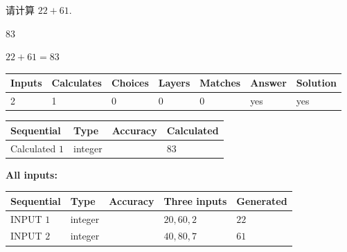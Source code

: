 \documentclass{ctexart}
\begin{document}
  
 
请计算 $ %
22 +  %
61 $.
 
 
 
\noindent{}
 
 

83
 
 
\noindent{}
 
 

 
 
 
\noindent{}
 
 

$ %
22 +  %
61=   %
83$
 
 
\noindent{}
 
 

 
   
   
   
   
\noindent\begin{tabular}{|l|l|l|l|l|l|l|}
 \hline
Inputs & Calculates & Choices & Layers & Matches & Answer & Solution \\ \hline
 2  & 
 1  & 
 0
  & 
 0  & 
 0  & 
  yes & 
  yes 
  \\ \hline
 \end{tabular}
   
   
   
   
\noindent{}
   
   
  
  
\noindent\begin{tabular}{|l|l|l|l|}
\hline
 Sequential & Type & Accuracy & Calculated \\ 
\hline
 
 
  Calculated $  1 $ & integer &  & 
  $ 83 $ 
 \\  \hline  
 \end{tabular}
   
   
   
   
\noindent\vspace{0.1in}\hspace{-0.08in} {\textbf{\Large{All inputs: }}}
   
   
  
  
\noindent\begin{tabular}{|l|l|l|l|l|}
\hline
 Sequential & Type & Accuracy & Three inputs & Generated \\ 
\hline
 
 
  INPUT $  1 $ & integer &  & $
 20
 , 
 60
 , 
 2
 $ & $ 22 $ 
 \\  \hline  
 
 
  INPUT $  2 $ & integer &  & $
 40
 , 
 80
 , 
 7
 $ & $ 61 $ 
 \\  \hline  
 \end{tabular}
   
\end{document}
